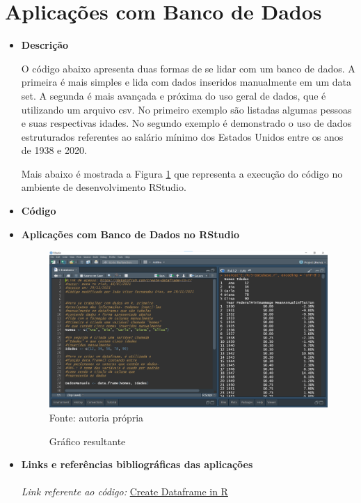   \section{Aplicações com Banco de Dados}
  \begin{itemize}
  	\item \textbf{Descrição}
  	
  	  O código abaixo apresenta duas formas de se lidar com um banco de dados. A primeira é mais simples e lida com dados inseridos manualmente em um data set. A segunda é mais avançada e próxima do uso geral de dados, que é utilizando um arquivo csv. No primeiro exemplo são listadas algumas pessoas e suas respectivas idades. No segundo exemplo é demonstrado o uso de dados estruturados referentes ao salário mínimo dos Estados Unidos entre os anos de 1938 e 2020.
  	
  	  Mais abaixo é mostrada a Figura \ref{Codigo_5} que representa a execução do código no ambiente de desenvolvimento RStudio.
  	  
  	\item \textbf{Código} 
  	
  	
  	\color{blue}
  	
  	\color{black}
  	
  	\item \textbf{Aplicações com Banco de Dados no RStudio}
  	
	  	\begin{figure}[H]  \label{Codigo_5}
	  		\centering
	  		\caption{Gráfico resultante}
	  		\includegraphics[width=16cm]{PicturesJoaoDias/Codigos/Codigo5.png}
	  		{\tiny \sf Fonte: autoria própria}
	  	\end{figure}
  	
  	\item \textbf{Links e referências bibliográficas das aplicações}
  	  \\ \\
  	  \textit{Link referente ao código:} 
  	  \href{https://datatofish.com/create-dataframe-in-r/}{Create  Dataframe in R}
  	  

\end{itemize}
